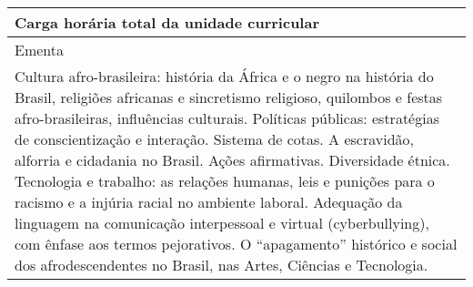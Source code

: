 \begin{quadro}[ht!]
\begin{tabular}{|p{3cm} p{2cm} p{3cm} p{2cm} p{3cm} p{2cm}|}
\multicolumn{5}{|p{13cm}|}{\cellcolor{blue1} Carga horária total da unidade curricular} & \multicolumn{1}{p{1cm}|}{\raggedleft 30	}\\\hline
\multicolumn{6}{|p{15cm}|}{\cellcolor{blue1} Ementa} \\\hline
\hline\multicolumn{6}{|p{15cm}|}{\scriptsize Cultura afro-brasileira: história da África e o negro na história do Brasil, religiões africanas e sincretismo religioso, quilombos e festas afro-brasileiras, influências culturais. Políticas públicas: estratégias de conscientização e interação. Sistema de cotas. A escravidão, alforria e cidadania no Brasil. Ações afirmativas. Diversidade étnica. Tecnologia e trabalho:  as relações humanas, leis e punições para o racismo e a injúria racial no ambiente laboral. Adequação da linguagem na comunicação interpessoal e virtual (cyberbullying), com ênfase   aos termos pejorativos. O ``apagamento'' histórico e social dos afrodescendentes no Brasil, nas Artes, Ciências e Tecnologia.}\\\hline
\hline
	\end{tabular}
\end{quadro}
